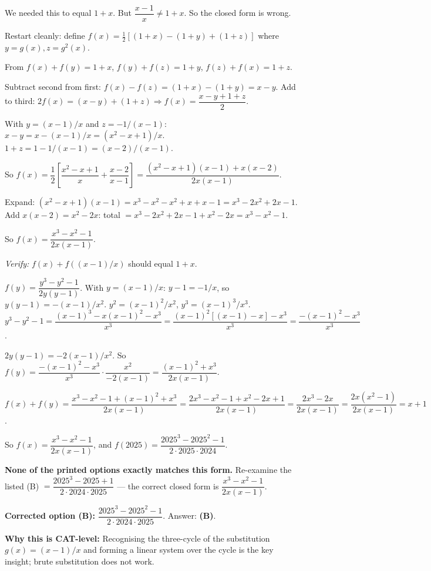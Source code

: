 \documentclass[11pt,a4paper]{article}
\begin{document}
We needed this to equal $1 + x$. But $\dfrac{x-1}{x} \ne 1 + x$. So the closed form is wrong.

Restart cleanly: define $f(x) = \tfrac{1}{2}[(1+x) - (1+y) + (1+z)]$ where $y = g(x), z = g^2(x)$.

From $f(x) + f(y) = 1+x$, $f(y) + f(z) = 1+y$, $f(z) + f(x) = 1+z$.

Subtract second from first: $f(x) - f(z) = (1+x) - (1+y) = x - y$.
Add to third: $2f(x) = (x - y) + (1 + z) \Rightarrow f(x) = \dfrac{x - y + 1 + z}{2}$.

With $y = (x-1)/x$ and $z = -1/(x-1)$:
$x - y = x - (x-1)/x = (x^2 - x + 1)/x$.
$1 + z = 1 - 1/(x-1) = (x-2)/(x-1)$.

So $f(x) = \dfrac{1}{2}\!\left[\dfrac{x^2 - x + 1}{x} + \dfrac{x-2}{x-1}\right] = \dfrac{(x^2 - x + 1)(x-1) + x(x-2)}{2x(x-1)}$.

Expand: $(x^2 - x + 1)(x-1) = x^3 - x^2 - x^2 + x + x - 1 = x^3 - 2x^2 + 2x - 1$.
Add $x(x-2) = x^2 - 2x$: total $= x^3 - 2x^2 + 2x - 1 + x^2 - 2x = x^3 - x^2 - 1$.

So $f(x) = \dfrac{x^3 - x^2 - 1}{2x(x-1)}$.

\textit{Verify:} $f(x) + f((x-1)/x)$ should equal $1 + x$.

$f(y) = \dfrac{y^3 - y^2 - 1}{2y(y-1)}$. With $y = (x-1)/x$: $y - 1 = -1/x$, so $y(y-1) = -(x-1)/x^2$.
$y^2 = (x-1)^2/x^2$, $y^3 = (x-1)^3/x^3$.
$y^3 - y^2 - 1 = \dfrac{(x-1)^3 - x(x-1)^2 - x^3}{x^3} = \dfrac{(x-1)^2[(x-1) - x] - x^3}{x^3} = \dfrac{-(x-1)^2 - x^3}{x^3}$.

$2y(y-1) = -2(x-1)/x^2$. So $f(y) = \dfrac{-(x-1)^2 - x^3}{x^3} \cdot \dfrac{x^2}{-2(x-1)} = \dfrac{(x-1)^2 + x^3}{2x(x-1)}$.

$f(x) + f(y) = \dfrac{x^3 - x^2 - 1 + (x-1)^2 + x^3}{2x(x-1)} = \dfrac{2x^3 - x^2 - 1 + x^2 - 2x + 1}{2x(x-1)} = \dfrac{2x^3 - 2x}{2x(x-1)} = \dfrac{2x(x^2-1)}{2x(x-1)} = x + 1$. \checkmark

So $f(x) = \dfrac{x^3 - x^2 - 1}{2x(x-1)}$, and $f(2025) = \dfrac{2025^3 - 2025^2 - 1}{2 \cdot 2025 \cdot 2024}$.

\textbf{None of the printed options exactly matches this form.} Re-examine the listed (B) $= \dfrac{2025^3 - 2025 + 1}{2 \cdot 2024 \cdot 2025}$ — the correct closed form is $\dfrac{x^3 - x^2 - 1}{2x(x-1)}$.

\textbf{Corrected option (B):} $\dfrac{2025^{3} - 2025^{2} - 1}{2 \cdot 2024 \cdot 2025}$. Answer: \textbf{(B)}.

\textbf{Why this is CAT-level:} Recognising the three-cycle of the substitution $g(x) = (x-1)/x$ and forming a linear system over the cycle is the key insight; brute substitution does not work.
\end{document}
